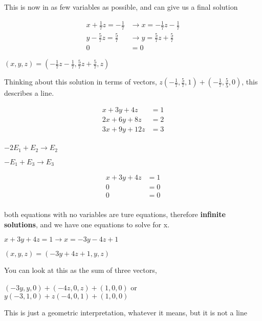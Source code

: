\begin{example}[3]
	This is now in as few variables as possible, and can give us a final solution

	\begin{align*}
		x + \frac{1}{7}z = - \frac{1}{7} & \to \boxed{x = - \frac{1}{7} z - \frac{1}{7}}\\
		y - \frac{5}{7}z =  \frac{5}{7} & \to \boxed{y =  \frac{5}{7} z + \frac{5}{7}}\\
		0 &= 0
	\end{align*}

	$ \boxed{(x,y,z) = \left( - \frac{1}{7}z - \frac{1}{7}, \frac{5}{7}z + \frac{5}{7}, z \right)} $
\end{example}

Thinking about this solution in terms of vectors, $z(-\frac{1}{7}, \frac{5}{7}, 1) + (-\frac{1}{7},
\frac{5}{5}, 0)$, this describes a line.

\begin{example}[4]

	\begin{align*}
		x + 3y + 4z &= 1 \\
		2x + 6y + 8z &= 2 \\
		3x + 9y + 12z &= 3 \\
	\end{align*}

$ -2 E_1 + E_2 \to E_2$

$-E_1+E_3\to E_3$

	\begin{align*}
		x + 3y + 4z &= 1 \\
		0 &= 0 \\
		0 &= 0 \\
	\end{align*}

	both equations with no variables are ture equations, therefore \textbf{infinite solutions}, and
	we have one equations to solve for x.


	$x + 3y + 4z = 1 \to x = -3y -4z +1$

	$\boxed{\left( x,y,z \right) = \left( -3y + 4z +1, y, z \right) }$


\end{example}

	You can look at this as the sum of three vectors,

	$(-3y, y, 0) + (-4z, 0, z) + (1, 0, 0)$
	or $y(-3, 1, 0) + z(-4, 0, 1 ) + (1, 0, 0)$

	This is just a geometric interpretation, whatever it means, but it is not a line


\newpage


